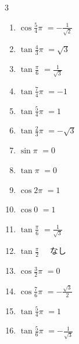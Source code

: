 \begin{multicols}{3}
\begin{enumerate}
  \item $\displaystyle \cos{\frac{5}{4}\pi}$
        $\displaystyle =-\frac{1}{\sqrt{2}}$

\columnbreak %

\resetques

  \item $\displaystyle \tan{\frac{4}{3}\pi}$
        $\displaystyle =\sqrt{3}$

  \item $\displaystyle \tan{\frac{\pi}{6}}$
        $\displaystyle =\frac{1}{\sqrt{3}}$

  \item $\displaystyle \tan{\frac{7}{4}\pi}$
        $\displaystyle =-1$

  \item $\displaystyle \tan{\frac{5}{4}\pi}$
        $\displaystyle =1$

  \item $\displaystyle \tan{\frac{2}{3}\pi}$
        $\displaystyle =-\sqrt{3}$

  \item $\displaystyle \sin{\pi}$
        $\displaystyle =0$

  \item $\displaystyle \tan{\pi}$
        $\displaystyle =0$

  \item $\displaystyle \cos{2\pi}$
        $\displaystyle =1$

  \item $\displaystyle \cos{0}$
        $\displaystyle =1$

  \item $\displaystyle \tan{\frac{\pi}{6}}$
        $\displaystyle =\frac{1}{\sqrt{3}}$

  \item $\displaystyle \tan{\frac{\pi}{2}}$
        $\displaystyle \quad なし$

  \item $\displaystyle \cos{\frac{3}{2}\pi}$
        $\displaystyle =0$

  \item $\displaystyle \cos{\frac{7}{6}\pi}$
        $\displaystyle =-\frac{\sqrt{3}}{2}$

  \item $\displaystyle \tan{\frac{5}{4}\pi}$
        $\displaystyle =1$

  \item $\displaystyle \tan{\frac{5}{6}\pi}$
        $\displaystyle =-\frac{1}{\sqrt{3}}$


\end{enumerate}
\end{multicols}
